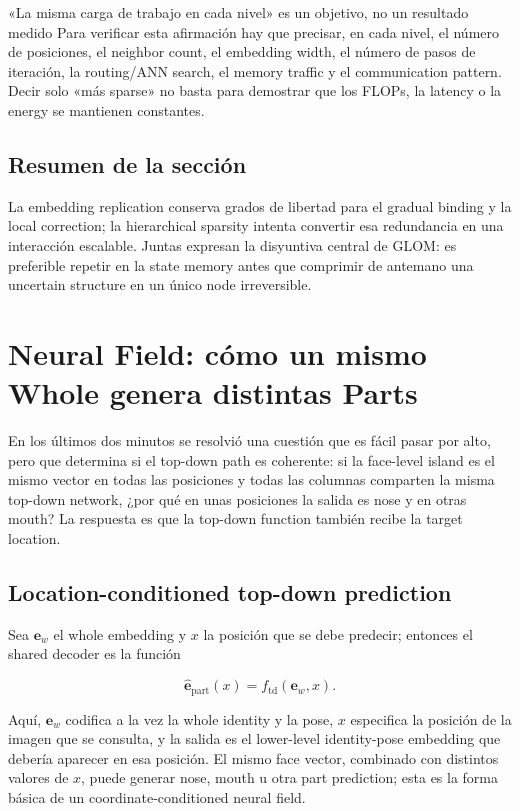 \documentclass[a4paper]{article}
\begin{document}
\begin{warningbox}{«La misma carga de trabajo en cada nivel» es un objetivo, no un resultado medido}
Para verificar esta afirmación hay que precisar, en cada nivel, el número de posiciones, el neighbor count, el embedding width, el número de pasos de iteración, la routing/ANN search, el memory traffic y el communication pattern. Decir solo «más sparse» no basta para demostrar que los FLOPs, la latency o la energy se mantienen constantes.
\end{warningbox}

\subsection{Resumen de la sección}

La embedding replication conserva grados de libertad para el gradual binding y la local correction; la hierarchical sparsity intenta convertir esa redundancia en una interacción escalable. Juntas expresan la disyuntiva central de GLOM: es preferible repetir en la state memory antes que comprimir de antemano una uncertain structure en un único node irreversible.
\section{Neural Field: cómo un mismo Whole genera distintas Parts}

En los últimos dos minutos se resolvió una cuestión que es fácil pasar por alto, pero que determina si el top-down path es coherente: si la face-level island es el mismo vector en todas las posiciones y todas las columnas comparten la misma top-down network, ¿por qué en unas posiciones la salida es nose y en otras mouth? La respuesta es que la top-down function también recibe la target location.

\subsection{Location-conditioned top-down prediction}

Sea $\mathbf e_w$ el whole embedding y $x$ la posición que se debe predecir; entonces el shared decoder es la función

\[
\hat{\mathbf e}_{\mathrm{part}}(x)=f_{\mathrm{td}}\!\left(\mathbf e_w,x\right).
\]

Aquí, $\mathbf e_w$ codifica a la vez la whole identity y la pose, $x$ especifica la posición de la imagen que se consulta, y la salida es el lower-level identity-pose embedding que debería aparecer en esa posición. El mismo face vector, combinado con distintos valores de $x$, puede generar nose, mouth u otra part prediction; esta es la forma básica de un coordinate-conditioned neural field.
\end{document}
